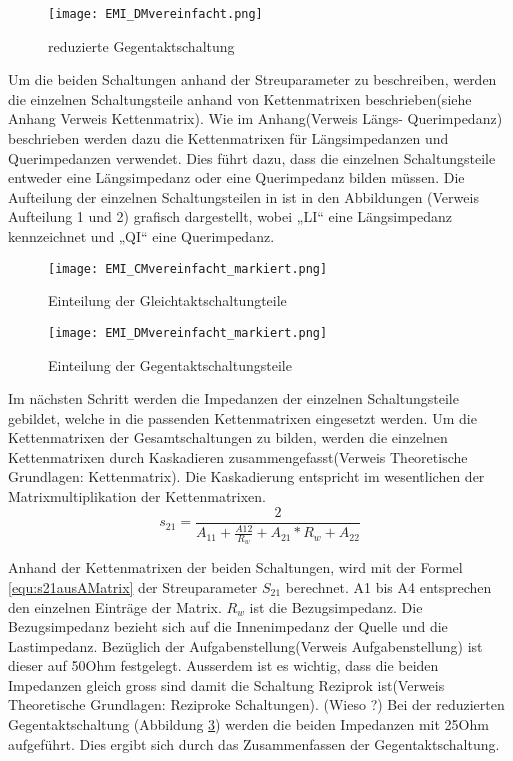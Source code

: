 \begin{figure}[H]
		\centering
		\texttt{[image: EMI\_DMvereinfacht.png]}
		\label{fig:dmschaltungvereinfacht}
		\caption{reduzierte Gegentaktschaltung}
\end{figure}
\newpage
Um die beiden Schaltungen anhand der Streuparameter zu beschreiben, werden die einzelnen Schaltungsteile anhand von Kettenmatrixen beschrieben(siehe Anhang Verweis Kettenmatrix). Wie im Anhang(Verweis Längs- Querimpedanz) beschrieben werden dazu die Kettenmatrixen für Längsimpedanzen und Querimpedanzen verwendet. Dies führt dazu, dass die einzelnen Schaltungsteile entweder eine Längsimpedanz oder eine Querimpedanz bilden müssen. Die Aufteilung der einzelnen Schaltungsteilen in ist in den Abbildungen (Verweis Aufteilung 1 und 2) grafisch dargestellt, wobei „LI“ eine Längsimpedanz kennzeichnet und „QI“ eine Querimpedanz.
\begin{figure}[H]
		\centering
		\texttt{[image: EMI\_CMvereinfacht\_markiert.png]}
		\label{fig:cmschaltung}
		\caption{Einteilung der Gleichtaktschaltungteile}
\end{figure}

\begin{figure}[H]
		\centering
		\texttt{[image: EMI\_DMvereinfacht\_markiert.png]}
		\label{fig:dmschaltung}
		\caption{Einteilung der Gegentaktschaltungsteile}
\end{figure}

Im nächsten Schritt werden die Impedanzen der einzelnen Schaltungsteile gebildet, welche in die passenden Kettenmatrixen eingesetzt werden. Um die Kettenmatrixen der Gesamtschaltungen zu bilden, werden die einzelnen Kettenmatrixen durch Kaskadieren zusammengefasst(Verweis Theoretische Grundlagen: Kettenmatrix). Die Kaskadierung entspricht im wesentlichen der Matrixmultiplikation der Kettenmatrixen. \\

\begin{equation}\label{equ:s21ausAMatrix}
s_{21} = \frac{2}{A_{11}+\frac{A{12}}{R_w}+A_{21}*R_w+A_{22}}
\end{equation}

Anhand der Kettenmatrixen der beiden Schaltungen, wird mit der Formel \ref{equ:s21ausAMatrix} der Streuparameter $S_{21}$ berechnet. A1 bis A4 entsprechen den einzelnen Einträge der Matrix. $R_w$ ist die Bezugsimpedanz. Die Bezugsimpedanz bezieht sich auf die Innenimpedanz der Quelle und die Lastimpedanz. Bezüglich der Aufgabenstellung(Verweis Aufgabenstellung) ist dieser auf 50Ohm festgelegt. Ausserdem ist es wichtig, dass die beiden Impedanzen gleich gross sind damit die Schaltung Reziprok ist(Verweis Theoretische Grundlagen: Reziproke Schaltungen). (Wieso ?) 
Bei der reduzierten Gegentaktschaltung (Abbildung \ref{fig:dmschaltung}) werden die beiden Impedanzen mit 25Ohm aufgeführt. Dies ergibt sich durch das Zusammenfassen der Gegentaktschaltung.\\

